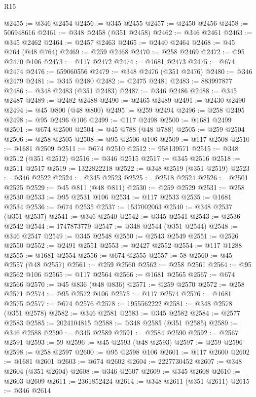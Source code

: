 \begin{lexlean}{R15}
\begin{coremodule}
@2455 := @346 @2454
@2456 := @345 @2455
@2457 := @2450 @2456
@2458 := 506948616
@2461 := @348 @2458 (@351 @2458)
@2462 := @346 @2461
@2463 := @345 @2462
@2464 := @2457 @2463
@2465 := @2440 @2464
@2468 := @45 @764 (@48 @764)
@2469 := @259 @2468
@2470 := @258 @2469
@2472 := @95 @2470 @106
@2473 := @117 @2472
@2474 := @1681 @2473
@2475 := @674 @2474
@2476 := 659060556
@2479 := @348 @2476 (@351 @2476)
@2480 := @346 @2479
@2481 := @345 @2480
@2482 := @2475 @2481
@2483 := 883997877
@2486 := @348 @2483 (@351 @2483)
@2487 := @346 @2486
@2488 := @345 @2487
@2489 := @2482 @2488
@2490 := @2465 @2489
@2491 := @2430 @2490
@2494 := @45 @800 (@48 @800)
@2495 := @259 @2494
@2496 := @258 @2495
@2498 := @95 @2496 @106
@2499 := @117 @2498
@2500 := @1681 @2499
@2501 := @674 @2500
@2504 := @45 @788 (@48 @788)
@2505 := @259 @2504
@2506 := @258 @2505
@2508 := @95 @2506 @106
@2509 := @117 @2508
@2510 := @1681 @2509
@2511 := @674 @2510
@2512 := 958139571
@2515 := @348 @2512 (@351 @2512)
@2516 := @346 @2515
@2517 := @345 @2516
@2518 := @2511 @2517
@2519 := 1322822218
@2522 := @348 @2519 (@351 @2519)
@2523 := @346 @2522
@2524 := @345 @2523
@2525 := @2518 @2524
@2526 := @2501 @2525
@2529 := @45 @811 (@48 @811)
@2530 := @259 @2529
@2531 := @258 @2530
@2533 := @95 @2531 @106
@2534 := @117 @2533
@2535 := @1681 @2534
@2536 := @674 @2535
@2537 := 1537002063
@2540 := @348 @2537 (@351 @2537)
@2541 := @346 @2540
@2542 := @345 @2541
@2543 := @2536 @2542
@2544 := 1747873779
@2547 := @348 @2544 (@351 @2544)
@2548 := @346 @2547
@2549 := @345 @2548
@2550 := @2543 @2549
@2551 := @2526 @2550
@2552 := @2491 @2551
@2553 := @2427 @2552
@2554 := @117 @1288
@2555 := @1681 @2554
@2556 := @674 @2555
@2557 := 58
@2560 := @45 @2557 (@48 @2557)
@2561 := @259 @2560
@2562 := @258 @2561
@2564 := @95 @2562 @106
@2565 := @117 @2564
@2566 := @1681 @2565
@2567 := @674 @2566
@2570 := @45 @836 (@48 @836)
@2571 := @259 @2570
@2572 := @258 @2571
@2574 := @95 @2572 @106
@2575 := @117 @2574
@2576 := @1681 @2575
@2577 := @674 @2576
@2578 := 1955562222
@2581 := @348 @2578 (@351 @2578)
@2582 := @346 @2581
@2583 := @345 @2582
@2584 := @2577 @2583
@2585 := 2024104815
@2588 := @348 @2585 (@351 @2585)
@2589 := @346 @2588
@2590 := @345 @2589
@2591 := @2584 @2590
@2592 := @2567 @2591
@2593 := 59
@2596 := @45 @2593 (@48 @2593)
@2597 := @259 @2596
@2598 := @258 @2597
@2600 := @95 @2598 @106
@2601 := @117 @2600
@2602 := @1681 @2601
@2603 := @674 @2602
@2604 := 2227730452
@2607 := @348 @2604 (@351 @2604)
@2608 := @346 @2607
@2609 := @345 @2608
@2610 := @2603 @2609
@2611 := 2361852424
@2614 := @348 @2611 (@351 @2611)
@2615 := @346 @2614

\end{coremodule}
\end{lexlean}
